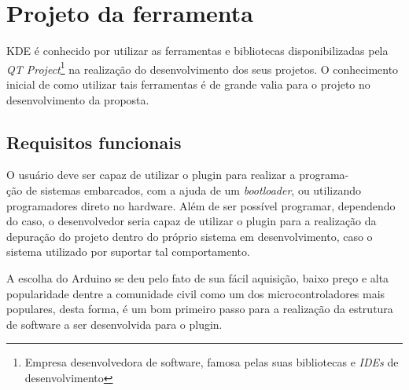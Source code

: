 \chapter{Projeto da ferramenta}

KDE é conhecido por utilizar as ferramentas e bibliotecas disponibilizadas pela \textit{QT Project}\footnote{Empresa desenvolvedora  de software, famosa pelas suas bibliotecas e \textit{IDEs} de desenvolvimento} na realização do desenvolvimento dos seus projetos. O conhecimento inicial de como utilizar tais ferramentas é de grande valia para o projeto no desenvolvimento da proposta.


\section{Requisitos funcionais}

O usuário deve ser capaz de utilizar o plugin para realizar a programa-\\ção de sistemas embarcados, com a ajuda de um \textit{bootloader}, ou utilizando programadores direto no hardware. Além de ser possível programar, dependendo do caso, o desenvolvedor seria capaz de utilizar o plugin para a realização da depuração do projeto dentro do próprio sistema em desenvolvimento, caso o sistema utilizado por suportar tal comportamento.

A escolha do Arduino se deu pelo fato de sua fácil aquisição, baixo preço e alta popularidade dentre a comunidade civil como um dos microcontroladores mais populares, desta forma, é um bom primeiro passo para a realização da estrutura de software a ser desenvolvida para o plugin.


